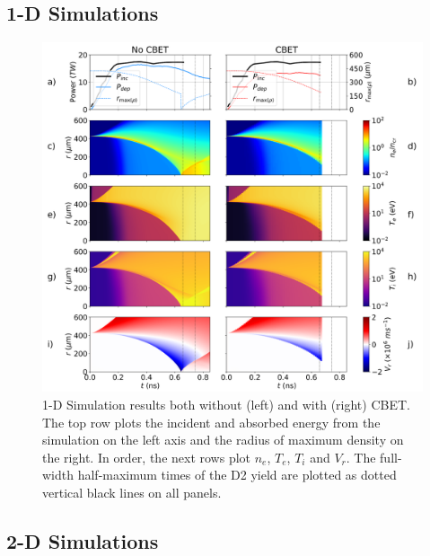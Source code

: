 \subsection{1-D Simulations}%
\label{sec:Res2_expl1D}


\begin{figure}[t!]
    \includegraphics[width=\linewidth]{Results2/Images/expl_streaks.png}
    \centering
    \caption{1-D Simulation results both without (left) and with (right) \ac{CBET}.
    The top row plots the incident and absorbed energy from the simulation on the left axis and the radius of maximum density on the right.
    In order, the next rows plot $n_e$, $T_e$, $T_i$ and $V_r$.
    The full-width half-maximum times of the D2 yield are plotted as dotted vertical black lines on all panels.}%
    \label{fig:Res2_expl_streaks}
\end{figure}

\subsection{2-D Simulations}%
\label{sec:Res2_expl2D}


